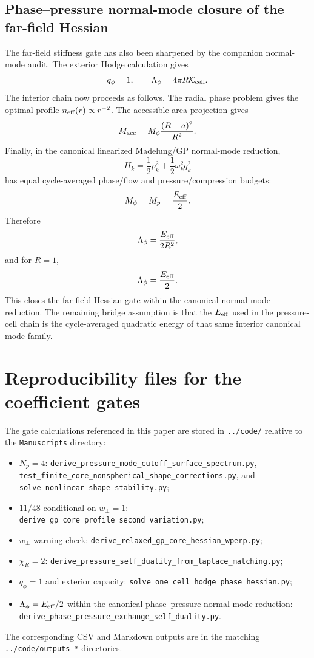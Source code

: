 \documentclass[11pt]{article}
\begin{document}
\subsection{Phase--pressure normal-mode closure of the far-field Hessian}

The far-field stiffness gate has also been sharpened by the companion
normal-mode audit.  The exterior Hodge calculation gives
\[
  q_\phi=1,\qquad \Lambda_\phi=4\pi R\mathcal K_{\rm cell}.
\]
The interior chain now proceeds as follows.  The radial phase problem gives the
optimal profile \(n_{\rm eff}(r)\propto r^{-2}\).  The accessible-area
projection gives
\[
  M_{\rm acc}=M_\phi\frac{(R-a)^2}{R^2}.
\]
Finally, in the canonical linearized Madelung/GP normal-mode reduction,
\[
  H_k=\frac12p_k^2+\frac12\omega_k^2q_k^2
\]
has equal cycle-averaged phase/flow and pressure/compression budgets:
\[
  M_\phi=M_p=\frac{E_{\rm eff}}{2}.
\]
Therefore
\[
  \Lambda_\phi=\frac{E_{\rm eff}}{2R^2},
\]
and for \(R=1\),
\[
  \Lambda_\phi=\frac{E_{\rm eff}}{2}.
\]
This closes the far-field Hessian gate within the canonical normal-mode
reduction.  The remaining bridge assumption is that the \(E_{\rm eff}\) used in
the pressure-cell chain is the cycle-averaged quadratic energy of that same
interior canonical mode family.

\section{Reproducibility files for the coefficient gates}
\label{sec:gate-reproducibility-files}

The gate calculations referenced in this paper are stored in \texttt{../code/}
relative to the \texttt{Manuscripts} directory:
\begin{itemize}
\item \(N_p=4\): \texttt{derive\_pressure\_mode\_cutoff\_surface\_spectrum.py},
\texttt{test\_finite\_core\_nonspherical\_shape\_corrections.py}, and
\texttt{solve\_nonlinear\_shape\_stability.py};
\item \(11/48\) conditional on \(w_\perp=1\):
\texttt{derive\_gp\_core\_profile\_second\_variation.py};
\item \(w_\perp\) warning check:
\texttt{derive\_relaxed\_gp\_core\_hessian\_wperp.py};
\item \(\chi_R=2\): \texttt{derive\_pressure\_self\_duality\_from\_laplace\_matching.py};
\item \(q_\phi=1\) and exterior capacity:
\texttt{solve\_one\_cell\_hodge\_phase\_hessian.py};
\item \(\Lambda_\phi=E_{\rm eff}/2\) within the canonical phase--pressure
normal-mode reduction:
\texttt{derive\_phase\_pressure\_exchange\_self\_duality.py}.
\end{itemize}
The corresponding CSV and Markdown outputs are in the matching
\texttt{../code/outputs\_*} directories.
\end{document}
